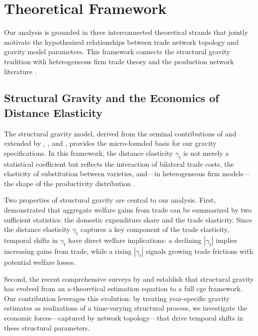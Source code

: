 \documentclass[preprint, 3p,
authoryear]{elsarticle} %
\begin{document}
\section{Theoretical Framework}\label{sec:theory}

Our analysis is grounded in three interconnected theoretical strands
that jointly motivate the hypothesized relationships between trade
network topology and gravity model parameters. This framework connects
the structural gravity tradition
\citep{anderson2003, headmayer2014, yotov2024evolution} with
heterogeneous firm trade theory \citep{melitz2015new, chaney2014} and
the production network literature
\citep{acemoglu2012, baqaee2019macroeconomic}.

\subsection{Structural Gravity and the Economics of Distance
Elasticity}\label{subsec:theory_gravity}

The structural gravity model, derived from the seminal contributions of
\citet{anderson1979, anderson2003} and extended by \citet{eaton2002},
\citet{helpman2008}, and \citet{melitz2015new}, provides the
micro-founded basis for our gravity specifications. In this framework,
the distance elasticity \(\gamma_t\) is not merely a statistical
coefficient but reflects the interaction of bilateral trade costs, the
elasticity of substitution between varieties, and---in heterogeneous
firm models---the shape of the productivity distribution
\citep{carrere2020gravity, arkolakis2012new}.

Two properties of structural gravity are central to our analysis. First,
\citet{arkolakis2012new} demonstrated that aggregate welfare gains from
trade can be summarized by two sufficient statistics: the domestic
expenditure share and the trade elasticity. Since the distance
elasticity \(\gamma_t\) captures a key component of the trade
elasticity, temporal shifts in \(\gamma_t\) have direct welfare
implications: a declining \(|\gamma_t|\) implies increasing gains from
trade, while a rising \(|\gamma_t|\) signals growing trade frictions
with potential welfare losses.

Second, the recent comprehensive surveys by \citet{yotov2024evolution}
and \citet{larch2025estimating} establish that structural gravity has
evolved from an a-theoretical estimation equation to a full \gls{cge}
framework. Our contribution leverages this evolution: by treating
year-specific gravity estimates as realizations of a time-varying
structural process, we investigate the economic forces---captured by
network topology---that drive temporal shifts in these structural
parameters.
\end{document}
